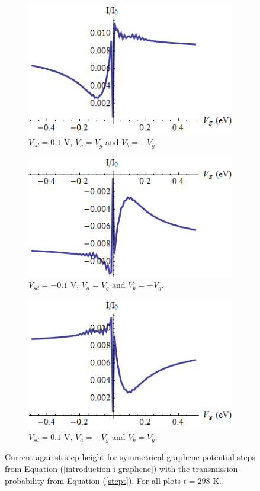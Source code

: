 		\begin{figure}[h]
			 \begin{subfigure}[h]{0.3\textwidth}
				\centerline{\includegraphics[scale=0.35]{images/step-vg-1}}
				\caption{$V_{sd}=0.1$ V, $V_{a}=V_{g}$ and $V_{b}=-V_{g}$.}
			\end{subfigure}
			\hspace{0.5cm}
			\begin{subfigure}[h]{0.3\textwidth}
				\centerline{\includegraphics[scale=0.35]{images/step-vg-2}}
				\caption{$V_{sd}=-0.1$ V, $V_{a}=V_{g}$ and $V_{b}=-V_{g}$.}
			\end{subfigure}
			\hspace{0.5cm}
			\begin{subfigure}[h]{0.3\textwidth}
				\centerline{\includegraphics[scale=0.35]{images/step-vg-3}}
				\caption{$V_{sd}=0.1$ V, $V_{a}=-V_{g}$ and $V_{b}=V_{g}$.}
			\end{subfigure}
			\caption{Current against step height for symmetrical graphene potential steps from Equation (\ref{introduction-i-graphene}) with the transmission probability from Equation (\ref{stept}). For all plots $t=298$ K.}
			\label{step-ivg-500}
		\end{figure}
